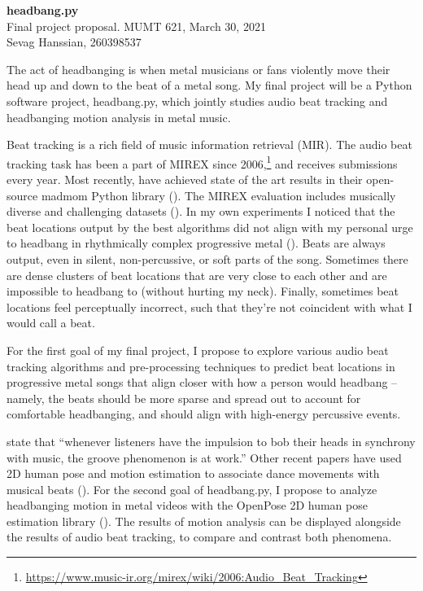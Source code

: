 \documentclass[letter,12pt]{report}
\begin{document}
\noindent\Large{\textbf{headbang.py}}\\
\large{Final project proposal. MUMT 621, March 30, 2021}\\
\large{Sevag Hanssian, 260398537}

\noindent\hrulefill

\vspace{2em}

The act of headbanging is when metal musicians or fans violently move their head up and down to the beat of a metal song. My final project will be a Python software project, headbang.py, which jointly studies audio beat tracking and headbanging motion analysis in metal music.

Beat tracking is a rich field of music information retrieval (MIR). The audio beat tracking task has been a part of MIREX since 2006,\footnote{\url{https://www.music-ir.org/mirex/wiki/2006:Audio_Beat_Tracking}} and receives submissions every year. Most recently, \textcite{bock1, bock2} have achieved state of the art results in their open-source madmom Python library (\cite{madmom}). The MIREX evaluation includes musically diverse and challenging datasets (\cite{beatmeta}). In my own experiments I noticed that the beat locations output by the best algorithms did not align with my personal urge to headbang in rhythmically complex progressive metal (\cite{meshuggah, periphery}). Beats are always output, even in silent, non-percussive, or soft parts of the song. Sometimes there are dense clusters of beat locations that are very close to each other and are impossible to headbang to (without hurting my neck). Finally, sometimes beat locations feel perceptually incorrect, such that they're not coincident with what I would call a beat.

For the first goal of my final project, I propose to explore various audio beat tracking algorithms and pre-processing techniques to predict beat locations in progressive metal songs that align closer with how a person would headbang -- namely, the beats should be more sparse and spread out to account for comfortable headbanging, and should align with high-energy percussive events.

\textcite{groove} state that ``whenever listeners have the impulsion to bob their heads in synchrony with music, the groove phenomenon is at work.'' Other recent papers have used 2D human pose and motion estimation to associate dance movements with musical beats (\cite{pose1, pose2}). For the second goal of headbang.py, I propose to analyze headbanging motion in metal videos with the OpenPose 2D human pose estimation library (\cite{openpose}). The results of motion analysis can be displayed alongside the results of audio beat tracking, to compare and contrast both phenomena.

\vfill
\clearpage

\printbibheading[title={\vspace{-3.5em}References},heading=bibnumbered]
\vspace{-1.5em}
\printbibliography[heading=none]
\end{document}
